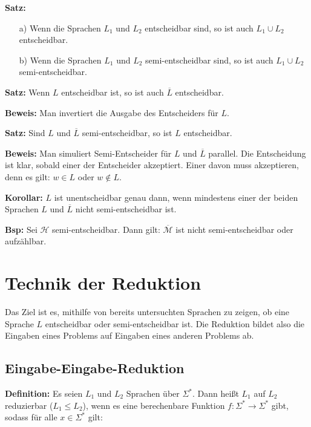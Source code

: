 \documentclass{scrartcl}%
\begin{document}
    \vspace*{0.3cm}
    \textbf{\textsf{Satz:}}
    \begin{itemize}
        \item [a)] Wenn die Sprachen $L_1$ und $L_2$ entscheidbar sind, so ist auch $L_1 \cup L_2$ entscheidbar.
        \item [b)] Wenn die Sprachen $L_1$ und $L_2$ semi-entscheidbar sind, so ist auch $L_1 \cup L_2$ semi-entscheidbar.
    \end{itemize}

    \vspace*{0.3cm}
    \textbf{\textsf{Satz:}} Wenn $L$ entscheidbar ist, so ist auch $\overline{L}$ entscheidbar.

    \vspace*{0.3cm}
    \textbf{\textsf{Beweis:}} Man invertiert die Ausgabe des Entscheiders für $L$.

    \vspace*{0.7cm}
    \textbf{\textsf{Satz:}} Sind $L$ und $\overline{L}$ semi-entscheidbar, so ist $L$ entscheidbar.

    \vspace*{0.3cm}
    \textbf{\textsf{Beweis:}} Man simuliert Semi-Entscheider für $L$ und $\overline{L}$ parallel.
    Die Entscheidung ist klar, sobald einer der Entscheider akzeptiert. Einer davon muss akzeptieren, denn es gilt:
    $w \in L$ oder $ w \notin L$.

    \vspace*{0.7cm}
    \textbf{\textsf{Korollar:}} $L$ ist unentscheidbar genau dann, wenn mindestens einer der beiden Sprachen $L$
    und $\overline{L}$ nicht semi-entscheidbar ist.

    \vspace*{0.3cm}
    \textbf{\textsf{Bsp:}} Sei $\mathcal{H}$ semi-entscheidbar. Dann gilt: $\overline{\mathcal{M}}$ ist nicht semi-entscheidbar oder aufzählbar.

    \section*{Technik der Reduktion}
    Das Ziel ist es, mithilfe von bereits untersuchten Sprachen zu zeigen,
    ob eine Sprache $L$ entscheidbar oder semi-entscheidbar ist.
    Die Reduktion bildet also die Eingaben eines Problems auf Eingaben eines anderen Problems ab.

    \subsection*{Eingabe-Eingabe-Reduktion}
    \textbf{\textsf{Definition:}} Es seien $L_1$ und $L_2$ Sprachen über $\Sigma^*$.
    Dann heißt $L_1$ auf $L_2$ reduzierbar ($L_1 \leq L_2$), wenn es eine berechenbare Funktion $f: \Sigma^* \rightarrow \Sigma^*$
    gibt, sodass für alle $x \in \Sigma^*$ gilt:
\end{document}
